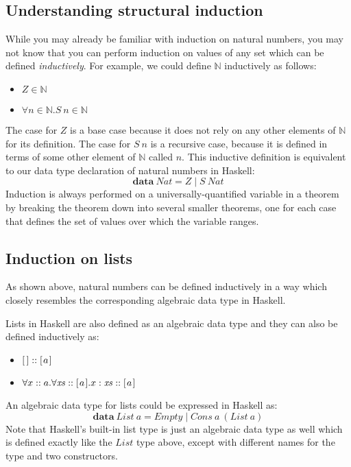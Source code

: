 \subsection{Understanding structural induction}

While you may already be familiar with induction on natural numbers, you may not know that you can perform induction on values of any set which can be defined \emph{inductively}. For example, we could define $\mathbb{N}$ inductively as follows:
\begin{itemize}
\item $Z \in \mathbb{N}$
\item $\forall n \in \mathbb{N}. \mathit{S}~n \in \mathbb{N}$
\end{itemize}
The case for $Z$ is a base case because it does not rely on any other elements of $\mathbb{N}$ for its definition. The case for $S~n$ is a recursive case, because it is defined in terms of some other element of $\mathbb{N}$ called $n$.
This inductive definition is equivalent to our data type declaration of natural numbers in Haskell:
\begin{displaymath}
\mathbf{data}~\mathit{Nat} = Z \mid S~\mathit{Nat}
\end{displaymath}
Induction is always performed on a universally-quantified variable in a theorem by breaking the theorem down into several smaller theorems, one for each case that defines the set of values over which the variable ranges.

\subsection{Induction on lists}

As shown above, natural numbers can be defined inductively in a way which closely resembles the corresponding algebraic data type in Haskell. 

Lists in Haskell are also defined as an algebraic data type and they can also be defined inductively as:
\begin{itemize}
\item $\hslist{} :: \hslist{a}$
\item $\forall x :: a. \forall \mathit{xs} :: [\mskip1.5mu a \mskip1.5mu].x:\mathit{xs} :: [\mskip1.5mu a \mskip1.5mu]$
\end{itemize}
An algebraic data type for lists could be expressed in Haskell as:
\begin{displaymath}
\mathbf{data}~\mathit{List}~a = \mathit{Empty} \mid \mathit{Cons}~a~(\mathit{List}~a)
\end{displaymath}
Note that Haskell's built-in list type is just an algebraic data type as well which is defined exactly like the $\mathit{List}$ type above, except with different names for the type and two constructors.

